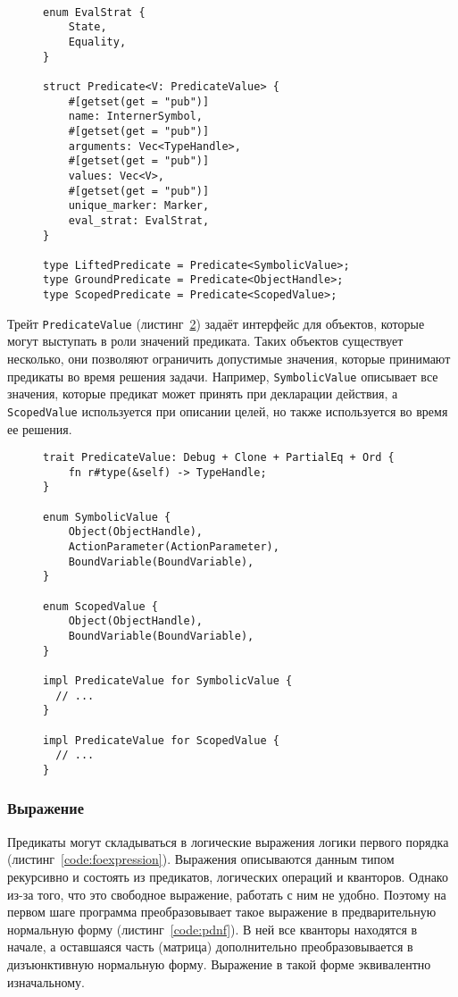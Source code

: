\documentclass{article}
\begin{document}
\begin{figure}
  \begin{verbatim}

enum EvalStrat {
    State,
    Equality,
}

struct Predicate<V: PredicateValue> {
    #[getset(get = "pub")]
    name: InternerSymbol,
    #[getset(get = "pub")]
    arguments: Vec<TypeHandle>,
    #[getset(get = "pub")]
    values: Vec<V>,
    #[getset(get = "pub")]
    unique_marker: Marker,
    eval_strat: EvalStrat,
}

type LiftedPredicate = Predicate<SymbolicValue>;
type GroundPredicate = Predicate<ObjectHandle>;
type ScopedPredicate = Predicate<ScopedValue>;
  \end{verbatim}
  \label{code:predicate}
\end{figure}

Трейт \texttt{PredicateValue} (листинг~\ref{code:valuetrait}) задаёт интерфейс для объектов,
которые могут выступать в роли значений предиката.
Таких объектов существует несколько, они позволяют ограничить допустимые значения, которые принимают предикаты во время решения задачи.
Например, \texttt{SymbolicValue} описывает все значения, которые предикат может принять при декларации действия,
а \texttt{ScopedValue} используется при описании целей, но также используется во время ее решения.

\begin{figure}
  \begin{verbatim}
trait PredicateValue: Debug + Clone + PartialEq + Ord {
    fn r#type(&self) -> TypeHandle;
}

enum SymbolicValue {
    Object(ObjectHandle),
    ActionParameter(ActionParameter),
    BoundVariable(BoundVariable),
}

enum ScopedValue {
    Object(ObjectHandle),
    BoundVariable(BoundVariable),
}

impl PredicateValue for SymbolicValue {
  // ...
}

impl PredicateValue for ScopedValue {
  // ...
}
  \end{verbatim}
  \label{code:valuetrait}
\end{figure}

\subsubsection{Выражение}

Предикаты могут складываться в логические выражения логики первого порядка (листинг~\ref{code:foexpression}).
Выражения описываются данным типом рекурсивно и состоять из предикатов, логических операций и кванторов.
Однако из-за того, что это свободное выражение, работать с ним не удобно.
Поэтому на первом шаге программа преобразовывает такое выражение в предварительную нормальную форму (листинг~\ref{code:pdnf}).
В ней все кванторы находятся в начале, а оставшаяся часть (матрица) дополнительно преобразовывается в дизъюнктивную нормальную форму.
Выражение в такой форме эквивалентно изначальному.
\end{document}
